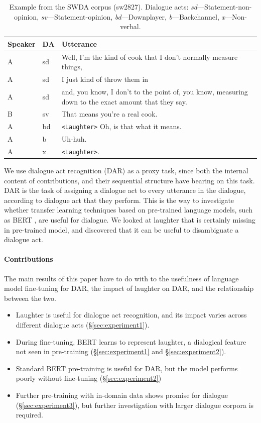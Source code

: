 \documentclass[11pt,a4paper]{article}
\begin{document}
\begin{table}
      \small
  \centering
  \begin{tabularx}{\linewidth}{llL}
    \toprule
    Speaker & DA & Utterance \\ \midrule
    A	&sd	& Well, I'm the kind of cook that I don't normally measure things,  \\
    A	&sd	& I just kind of throw them in \\
    A	&sd	& and, you know, I don't to the point of, you know, measuring down to the exact amount that they say.  \\
    B	&sv	& That means you're a real cook. \\
    A	&bd	& \texttt{<Laughter>} Oh, is that what it means.  \\
    A	&b	& Uh-huh.  \\
    A	&x	& \texttt{<Laughter>}.\\
             \bottomrule
  \end{tabularx}
  \caption{Example from the SWDA corpus (sw2827). Dialogue acts: \emph{sd}---Statement-non-opinion, \emph{sv}---Statement-opinion, \emph{bd}---Downplayer, \emph{b}---Backchannel, \emph{x}---Non-verbal. }
  \label{table:example}
\end{table}

We use dialogue act recognition (DAR) as a proxy task, since both the internal content of contributions, and their sequential structure have bearing on this task. DAR is the task of assigning a dialogue act to every utterance in the dialogue, according to dialogue act that they perform.
This is the way to investigate whether transfer learning techniques based on pre-trained language models, such as BERT \citep{devlinBERTPretrainingDeep2018}, are useful for dialogue.
We looked at laughter that is certainly missing in pre-trained model, and discovered that it can be useful to disambiguate a dialogue act.

\paragraph{Contributions}
The main results of this paper have to do with to the usefulness of language model fine-tuning for DAR, the impact of laughter on DAR, and the relationship between the two.
\begin{itemize}
  \item Laughter is useful for dialogue act recognition, and its impact varies across different dialogue acts (\S\ref{sec:experiment1}).
  \item During fine-tuning, BERT learns to represent laughter, a dialogical feature not seen in pre-training (\S\ref{sec:experiment1} and \S\ref{sec:experiment2}).
  \item Standard BERT pre-training is useful for DAR, but the model performs poorly without fine-tuning (\S\ref{sec:experiment2})
  \item Further pre-training with in-domain data shows promise for dialogue (\S\ref{sec:experiment3}), but further investigation with larger dialogue corpora is required.
  \end{itemize}
\end{document}
